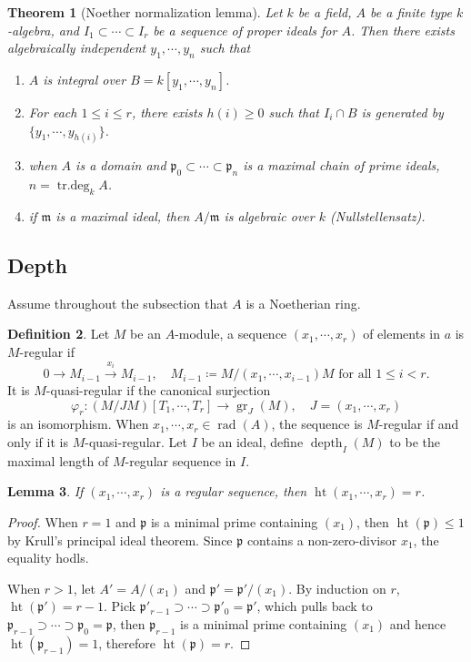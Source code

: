 \documentclass[leqno]{amsart}
\DeclareMathOperator{\gr}{gr}
\DeclareMathOperator{\hht}{ht}
\DeclareMathOperator{\rad}{rad}
\DeclareMathOperator{\trdeg}{tr.deg}
\DeclareMathOperator{\depth}{depth}
\newcommand{\1}{\mathbf{1}}
\newcommand{\fm}{\mathfrak m}
\newcommand{\fp}{\mathfrak p}
\newtheorem{thm}{Theorem}[section]
\newtheorem{lem}[thm]{Lemma}
\theoremstyle{definition}
\newtheorem{defn}[thm]{Definition}
\theoremstyle{remark}
\begin{document}
\begin{thm}[Noether normalization lemma]
	Let $k$ be a field, $A$ be a finite type $k$-algebra, 
	and $I_1\subset\cdots\subset I_r$ be 
	a sequence of proper ideals for $A$.
	Then there exists algebraically independent 
	${y_1,\cdots,y_n}$ such that
	\begin{enumerate}[label=(\alph*)]
		 \item $A$ is integral over $B=k[y_1,\cdots,y_n]$.
		 \item For each $1\leq i\leq r$,
			 there exists $h(i)\geq 0$ such that 
			 $I_i\cap B$ is generated by
			  $\{ y_1, \cdots,y_{h(i)}\}$.
	\item 
	when $A$ is a domain and 
	$\fp_0\subset \cdots\subset \fp_n$ 
	is a maximal chain of prime ideals, $n=\trdeg_k A$.
	\item
	if $\fm$ is a maximal ideal, 
	then $A/\fm$ is algebraic over $k$
	(Nullstellensatz).
	\end{enumerate}
\end{thm}

\subsection{Depth}
Assume throughout the subsection that $A$ is a Noetherian ring.
\begin{defn}
Let $M$ be an  $A$-module, 
a sequence $(x_1,\cdots,x_r)$ of elements in $a$ is $M$-regular if
\[
	0\to M_{i-1}\xrightarrow{x_i} M_{i-1},\quad
	M_{i-1}\coloneqq M/(x_1,\cdots,x_{i-1})M \text{ for all }
	1\leq i<r.
\]
It is $M$-quasi-regular if the canonical surjection
\[
	\varphi_r\colon (M/JM)[T_1,\cdots,T_r]\to \gr_J(M),\quad
	J=(x_1,\cdots,x_r)
\]
is an isomorphism.
When $x_1,\cdots,x_{r}\in \rad(A)$,
the sequence is $M$-regular
if and only if it is $M$-quasi-regular.
Let $I$ be an ideal,
define $\depth_I(M)$ to be the maximal length
of $M$-regular sequence in $I$.
\end{defn}
\begin{lem}
	If $(x_1,\cdots,x_r)$ is a regular sequence, 
	then $\hht(x_1,\cdots,x_r)=r$.
\end{lem}
\begin{proof}
	When $r=1$ and $\fp$ is a minimal prime 
	containing  $(x_1)$, then
	$\hht(\fp)\leq 1$ by Krull's principal ideal theorem.
	Since  $\fp$ contains a non-zero-divisor $x_1$,
	the equality hodls.

	When  $r>1$, let  $A'=A/(x_1)$ and $\fp'=\fp'/(x_1)$.
	By induction on $r$,
	$\hht(\fp')=r-1$.
	Pick  $\fp'_{r-1}\supset \cdots\supset \fp'_0=\fp'$,
	which pulls back to 
	$\fp_{r-1}\supset \cdots\supset \fp_0=\fp$,
	then $\fp_{r-1}$ is a minimal prime containing $(x_1)$
	and hence  $\hht(\fp_{r-1})=1$,
	therefore $\hht(\fp)=r$.
\end{proof}
\end{document}

